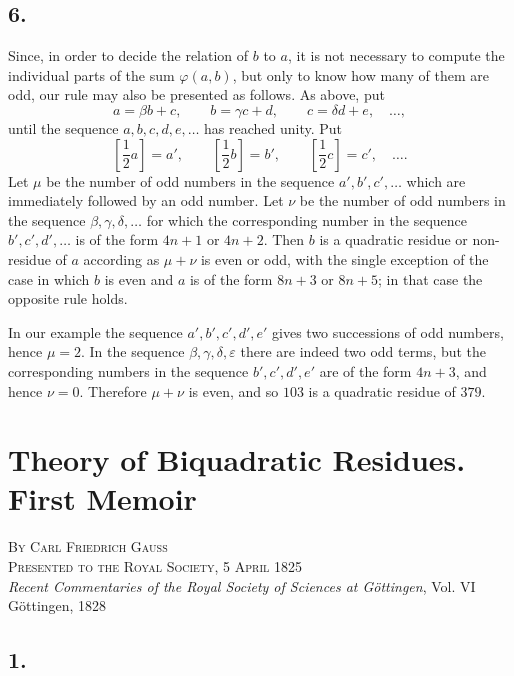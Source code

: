 \documentclass[12pt]{article}
\begin{document}
\subsection*{6.}

Since, in order to decide the relation of $b$ to $a$, it is not necessary to compute the individual parts of the sum $\varphi(a,b)$, but only to know how many of them are odd, our rule may also be presented as follows. As above, put
\[
a=\beta b+c,\qquad b=\gamma c+d,\qquad c=\delta d+e,\quad\ldots,
\]
until the sequence $a,b,c,d,e,\ldots$ has reached unity. Put
\[
\left[\frac12a\right]=a',\qquad \left[\frac12b\right]=b',\qquad \left[\frac12c\right]=c',\quad\ldots.
\]
Let $\mu$ be the number of odd numbers in the sequence $a',b',c',\ldots$ which are immediately followed by an odd number. Let $\nu$ be the number of odd numbers in the sequence $\beta,\gamma,\delta,\ldots$ for which the corresponding number in the sequence $b',c',d',\ldots$ is of the form $4n+1$ or $4n+2$. Then $b$ is a quadratic residue or non-residue of $a$ according as $\mu+\nu$ is even or odd, with the single exception of the case in which $b$ is even and $a$ is of the form $8n+3$ or $8n+5$; in that case the opposite rule holds.

In our example the sequence $a',b',c',d',e'$ gives two successions of odd numbers, hence $\mu=2$. In the sequence $\beta,\gamma,\delta,\varepsilon$ there are indeed two odd terms, but the corresponding numbers in the sequence $b',c',d',e'$ are of the form $4n+3$, and hence $\nu=0$. Therefore $\mu+\nu$ is even, and so $103$ is a quadratic residue of $379$.



\section*{Theory of Biquadratic Residues. First Memoir}

\begin{center}
\textsc{By Carl Friedrich Gauss}\\
\textsc{Presented to the Royal Society, 5 April 1825}\\[3pt]
\emph{Recent Commentaries of the Royal Society of Sciences at Göttingen}, Vol. VI\\
Göttingen, 1828
\end{center}

\subsection*{1.}
\end{document}
